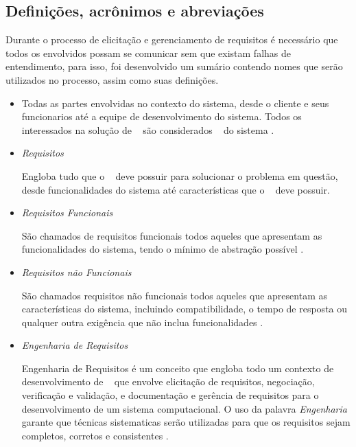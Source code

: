 \subsection{Definições, acrônimos e abreviações}

Durante o processo de elicitação e gerenciamento de requisitos é necessário que todos os envolvidos possam se comunicar sem que existam falhas de entendimento, para isso, foi desenvolvido um sumário contendo nomes que serão utilizados no processo, assim como suas definições.

\begin{itemize}

	\item \stakeholder

		Todas as partes envolvidas no contexto do sistema, desde o cliente e seus funcionarios até a equipe de desenvolvimento do sistema. Todos os interessados na solução de \sw~ são considerados \stakeholder~ do sistema \cite{sommerville2003engenharia}.

	\item \textit{Requisitos} 

		Engloba tudo que o \sw~ deve possuir para solucionar o problema em questão, desde funcionalidades do sistema até características que o \sw~ deve possuir.

	\item \textit{Requisitos Funcionais}

		São chamados de requisitos funcionais todos aqueles que apresentam as funcionalidades do sistema, tendo o mínimo de abstração possível \cite{sommerville2003engenharia}.

	\item \textit{Requisitos não Funcionais}

		São chamados requisitos não funcionais todos aqueles que apresentam as características do sistema, incluindo compatibilidade, o tempo de resposta ou qualquer outra exigência que não inclua funcionalidades \cite{sommerville2003engenharia}.

	\item \textit{Engenharia de Requisitos}

		Engenharia de Requisitos é um conceito que engloba todo um contexto de desenvolvimento de \sw~ que envolve elicitação de requisitos, negociação, verificação e validação, e documentação e gerência de requisitos para o desenvolvimento de um sistema computacional. O uso da palavra \textit{Engenharia} garante que técnicas sistematicas serão utilizadas para que os requisitos sejam completos, corretos e consistentes \cite{de2004analise}. 


\end{itemize}
